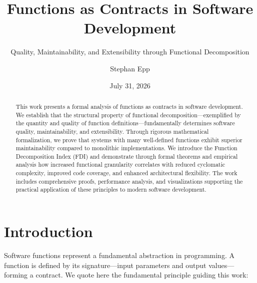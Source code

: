 \documentclass[a4paper,12pt]{article}
\title{Functions as Contracts in Software Development}
\subtitle{Quality, Maintainability, and Extensibility through Functional Decomposition}
\author{Stephan Epp}
\date{July 31, 2026}
\theoremstyle{definition}
\begin{document}
	
\maketitle

\begin{abstract}
This work presents a formal analysis of functions as contracts in software development. We establish that the structural property of functional decomposition—exemplified by the quantity and quality of function definitions—fundamentally determines software quality, maintainability, and extensibility. Through rigorous mathematical formalization, we prove that systems with many well-defined functions exhibit superior maintainability compared to monolithic implementations. We introduce the Function Decomposition Index (FDI) and demonstrate through formal theorems and empirical analysis how increased functional granularity correlates with reduced cyclomatic complexity, improved code coverage, and enhanced architectural flexibility. The work includes comprehensive proofs, performance analysis, and visualizations supporting the practical application of these principles to modern software development.
\end{abstract}

\tableofcontents
\newpage

\section{Introduction}

Software functions represent a fundamental abstraction in programming. A function is defined by its signature—input parameters and output values—forming a contract. We quote here the fundamental principle guiding this work:

\vspace{0.5cm}
\noindent
{}
\vspace{0.5cm}
\end{document}
